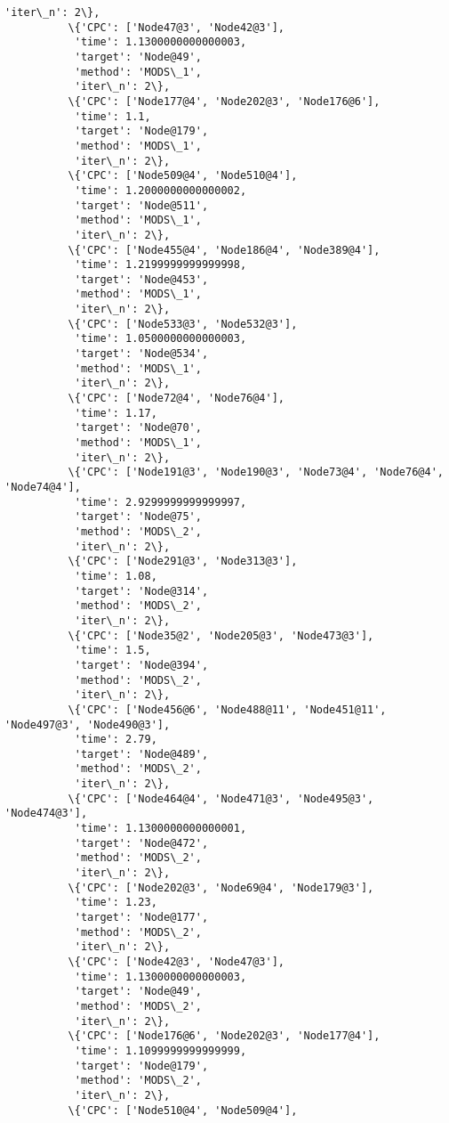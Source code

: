 \documentclass[11pt]{article}
\begin{document}
\begin{Verbatim}[commandchars=\\\{\}]
           'iter\_n': 2\},
          \{'CPC': ['Node47@3', 'Node42@3'],
           'time': 1.1300000000000003,
           'target': 'Node@49',
           'method': 'MODS\_1',
           'iter\_n': 2\},
          \{'CPC': ['Node177@4', 'Node202@3', 'Node176@6'],
           'time': 1.1,
           'target': 'Node@179',
           'method': 'MODS\_1',
           'iter\_n': 2\},
          \{'CPC': ['Node509@4', 'Node510@4'],
           'time': 1.2000000000000002,
           'target': 'Node@511',
           'method': 'MODS\_1',
           'iter\_n': 2\},
          \{'CPC': ['Node455@4', 'Node186@4', 'Node389@4'],
           'time': 1.2199999999999998,
           'target': 'Node@453',
           'method': 'MODS\_1',
           'iter\_n': 2\},
          \{'CPC': ['Node533@3', 'Node532@3'],
           'time': 1.0500000000000003,
           'target': 'Node@534',
           'method': 'MODS\_1',
           'iter\_n': 2\},
          \{'CPC': ['Node72@4', 'Node76@4'],
           'time': 1.17,
           'target': 'Node@70',
           'method': 'MODS\_1',
           'iter\_n': 2\},
          \{'CPC': ['Node191@3', 'Node190@3', 'Node73@4', 'Node76@4', 'Node74@4'],
           'time': 2.9299999999999997,
           'target': 'Node@75',
           'method': 'MODS\_2',
           'iter\_n': 2\},
          \{'CPC': ['Node291@3', 'Node313@3'],
           'time': 1.08,
           'target': 'Node@314',
           'method': 'MODS\_2',
           'iter\_n': 2\},
          \{'CPC': ['Node35@2', 'Node205@3', 'Node473@3'],
           'time': 1.5,
           'target': 'Node@394',
           'method': 'MODS\_2',
           'iter\_n': 2\},
          \{'CPC': ['Node456@6', 'Node488@11', 'Node451@11', 'Node497@3', 'Node490@3'],
           'time': 2.79,
           'target': 'Node@489',
           'method': 'MODS\_2',
           'iter\_n': 2\},
          \{'CPC': ['Node464@4', 'Node471@3', 'Node495@3', 'Node474@3'],
           'time': 1.1300000000000001,
           'target': 'Node@472',
           'method': 'MODS\_2',
           'iter\_n': 2\},
          \{'CPC': ['Node202@3', 'Node69@4', 'Node179@3'],
           'time': 1.23,
           'target': 'Node@177',
           'method': 'MODS\_2',
           'iter\_n': 2\},
          \{'CPC': ['Node42@3', 'Node47@3'],
           'time': 1.1300000000000003,
           'target': 'Node@49',
           'method': 'MODS\_2',
           'iter\_n': 2\},
          \{'CPC': ['Node176@6', 'Node202@3', 'Node177@4'],
           'time': 1.1099999999999999,
           'target': 'Node@179',
           'method': 'MODS\_2',
           'iter\_n': 2\},
          \{'CPC': ['Node510@4', 'Node509@4'],

\end{Verbatim}
\end{document}
